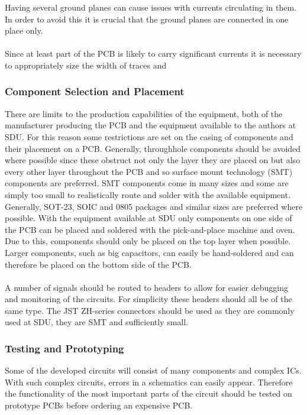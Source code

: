 Having several ground planes can cause issues with currents circulating in them.
In order to avoid this it is crucial that the ground planes are connected in one place only.
\\~\\
Since at least part of the PCB is likely to carry significant currents it is necessary to appropriately size the width of traces and 

\subsubsection{Component Selection and Placement} %
\label{ssub:component_case_selection_and_placement}
There are limits to the production capabilities of the equipment, both of the manufacturer producing the PCB and the equipment available to the authors at SDU.
For this reason some restrictions are set on the casing of components and their placement on a PCB.
Generally, throughhole components should be avoided where possible since these obstruct not only the layer they are placed on but also every other layer throughout the PCB and so surface mount technology (SMT) components are preferred.
SMT components come in many sizes and some are simply too small to realistically route and solder with the available equipment.
Generally, SOT-23, SOIC and 0805 packages and similar sizes are preferred where possible.
With the equipment available at SDU only components on one side of the PCB can be placed and soldered with the pick-and-place machine and oven.
Due to this, components should only be placed on the top layer when possible.
Larger components, such as big capacitors, can easily be hand-soldered and can therefore be placed on the bottom side of the PCB.
\\~\\
A number of signals should be routed to headers to allow for easier debugging and monitoring of the circuits.
For simplicity these headers should all be of the same type. 
The JST ZH-series connectors should be used as they are commonly used at SDU, they are SMT and sufficiently small. 


\subsubsection{Testing and Prototyping} %
Some of the developed circuits will consist of many components and complex ICs.
With such complex circuits, errors in a schematics can easily appear.
Therefore the functionality of the most important parts of the circuit should be tested on prototype PCBs before ordering an expensive PCB.

